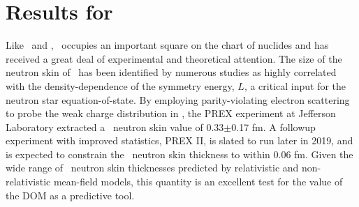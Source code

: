 \section{Results for \pbEight}
Like \caForty\ and \oSix, \pbEight\ occupies an important square on the chart of nuclides and has
received a great deal of experimental and theoretical attention. 
The size of the neutron skin of \pbEight\ has been identified by numerous studies as highly
correlated with the density-dependence of the symmetry energy, $L$, a critical input for the neutron
star equation-of-state. By employing parity-violating electron scattering to probe the
weak charge distribution in \pbEight, the PREX experiment at Jefferson Laboratory extracted a
\pbEight\ neutron skin value of 0.33$\pm$0.17 fm. A followup experiment with improved statistics, PREX II,
is slated to run later in 2019, and is expected to constrain the \pbEight\ neutron skin thickness to
within 0.06 fm. Given the wide range of \pbEight\ neutron skin thicknesses
predicted by relativistic
and non-relativistic mean-field models, this quantity is an excellent
test for the value of the DOM as a predictive tool.


